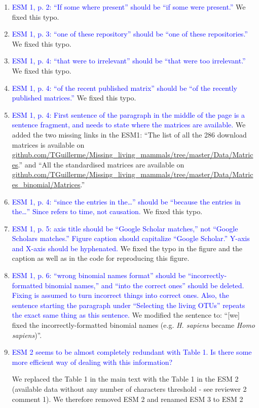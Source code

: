 \documentclass[12pt,letterpaper]{article}
\begin{document}
\begin{enumerate}
\item{\textcolor{blue}{ESM 1, p. 2: ``If some where present'' should be ``if some were present.''}}
We fixed this typo.

\item{\textcolor{blue}{ESM 1, p. 3: ``one of these repository'' should be ``one of these repositories.''}}
We fixed this typo.

\item{\textcolor{blue}{ESM 1, p. 4: ``that were to irrelevant'' should be ``that were too irrelevant.''}}
We fixed this typo.

\item{\textcolor{blue}{ESM 1, p. 4: ``of the recent published matrix'' should be ``of the recently published matrices.''}}
We fixed this typo.

\item{\textcolor{blue}{ESM 1, p. 4: First sentence of the paragraph in the middle of the page is a sentence fragment, and needs to state where the matrices are available.}}
We added the two missing links in the ESM1: ``The list of all the 286 download matrices is available on \url{github.com/TGuillerme/Missing_living_mammals/tree/master/Data/Matrices}.'' and ``All the standardised matrices are available on \url{github.com/TGuillerme/Missing_living_mammals/tree/master/Data/Matrices_binomial/Matrices}.''

\item{\textcolor{blue}{ESM 1, p. 4: ``since the entries in the…'' should be ``because the entries in the…'' Since refers to time, not causation.}}
We fixed this typo.

\item{\textcolor{blue}{ESM 1, p. 5: axis title should be ``Google Scholar matches,'' not ``Google Scholars matches.'' Figure caption should capitalize ``Google Scholar.'' Y-axis and X-axis should be hyphenated.}}
We fixed the typo in the figure and the caption as well as in the code for reproducing this figure.

\item{\textcolor{blue}{ESM 1, p. 6: ``wrong binomial names format'' should be ``incorrectly-formatted binomial names,'' and ``into the correct ones'' should be deleted.
Fixing is assumed to turn incorrect things into correct ones.
Also, the sentence starting the paragraph under ``Selecting the living OTUs'' repeats the exact same thing as this sentence.}}
We modified the sentence to: ``[we] fixed the incorrectly-formatted binomial names (e.g. \textit{H. sapiens} became \textit{Homo sapiens})''.

\item{\textcolor{blue}{ESM 2 seems to be almost completely redundant with Table 1. Is there some more efficient way of dealing with this information?}}

We replaced the Table 1 in the main text with the Table 1 in the ESM 2 (available data without any number of characters threshold - see reviewer 2 comment 1).
We therefore removed ESM 2 and renamed ESM 3 to ESM 2

\end{enumerate}
\end{document}
